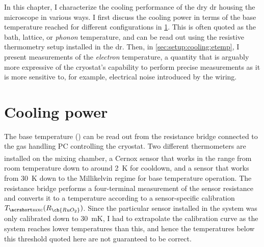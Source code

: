 In this chapter, I characterize the cooling performance of the dry \gls{dr} housing the microscope in various ways.
I first discuss the cooling power in terms of the base temperature \Tmxc reached for different configurations in \cref{sec:setup:cooling:power}.
This is often quoted as the bath, lattice, or \emph{phonon} temperature,
and can be read out using the resistive  thermometry setup installed in the \gls{dr}.
Then, in \cref{sec:setup:cooling:etemp}, I present measurements of the \emph{electron} temperature, a quantity that is arguably more expressive of the cryostat's capability to perform precise measurements as it is more sensitive to, for example, electrical noise introduced by the wiring.

\section{Cooling power}\label{sec:setup:cooling:power}
The base temperature (\Tmxc) can be read out from the resistance bridge connected to the gas handling PC controlling the cryostat.
Two different thermometers are installed on the mixing chamber, a Cernox\textsuperscript{\textregistered} sensor that works in the range from room temperature down to around \qty{2}{\kelvin} for cooldown, and a  sensor that works from \qty{30}{\kelvin} down to the Millikelvin regime for base temperature operation.
The resistance bridge performs a four-terminal measurement of the sensor resistance and converts it to a temperature according to a sensor-specific calibration $\Tmxc(R_{\ch{RuO_2}})$.
Since the particular sensor installed in the system was only calibrated down to \qty{30}{\milli\kelvin}, I had to extrapolate the calibration curve as the system reaches lower temperatures than this, and hence the temperatures below this threshold quoted here are not guaranteed to be correct.

